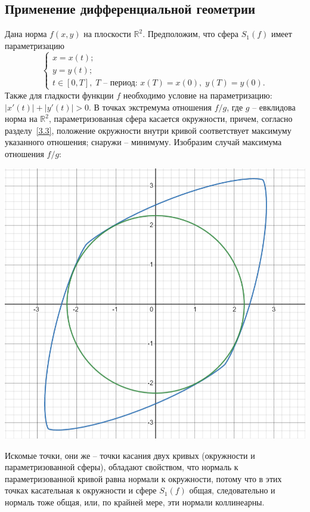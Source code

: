 \documentclass{article}
\begin{document}
\subsection{Применение дифференциальной геометрии} \label{3.4}
Дана норма $f(x,y)$ на плоскости $\mathbb{R}^2$. Предположим, что сфера $S_1(f)$ имеет параметризацию
\begin{equation*}
	\begin{cases}
		x = x(t); \\
		y = y(t); \\
		t \in [0, T], \; T \text{ -- период: } x(T) = x(0), \; y(T) = y(0).
	\end{cases}
\end{equation*}
Также для гладкости функции $f$ необходимо условие на параметризацию: $|x'(t)| + |y'(t)| > 0$. В точках экстремума отношения $f/g$, где $g$ -- евклидова норма на $\mathbb{R}^2$, параметризованная сфера касается окружности, причем, согласно разделу~\ref{3.3}, положение окружности внутри кривой соответствует максимуму указанного отношения; снаружи -- минимуму. Изобразим случай максимума отношения $f/g$: 
\begin{center}
\includegraphics[scale=0.5]{pictures/s1f_circle.png}
\end{center}
Искомые точки, они же -- точки касания двух кривых (окружности и параметризованной сферы), обладают свойством, что нормаль к параметризованной кривой равна нормали к окружности, потому что в этих точках касательная к окружности и сфере $S_1(f)$ общая, следовательно и нормаль тоже общая, или, по крайней мере, эти нормали коллинеарны.
\end{document}
